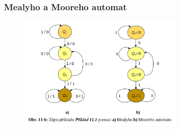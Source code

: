 \subsubsection{Mealyho a Mooreho automat}

\begin{figure}[!h]
    \centering
    \includegraphics[width=0.7\textwidth]{obrazky/100.png}
\end{figure}

